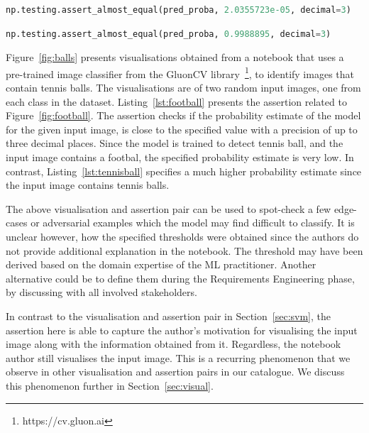 \documentclass[conference]{IEEEtran}
\begin{document}
\begin{lstlisting}[language=Python, caption={Assertion below Figure~\ref{fig:football}. It checks if the probability estimate of the model is close to the specified value. The input image is of a football. Since the model is trained to detect tennis balls, the specified value is very small.}, label={lst:football}]
np.testing.assert_almost_equal(pred_proba, 2.0355723e-05, decimal=3)
\end{lstlisting}

\begin{lstlisting}[language=Python, caption={Assertion below Figure~\ref{fig:tennisball}. Compared to Listing~\ref{lst:football}, the specified value is much higher, since the input image contains tennis balls.}, label={lst:tennisball}]
np.testing.assert_almost_equal(pred_proba, 0.9988895, decimal=3)
\end{lstlisting}

Figure~\ref{fig:balls} presents visualisations obtained from a notebook that uses a pre-trained image classifier from the GluonCV library~\footnote{https://cv.gluon.ai}, to identify images that contain tennis balls. The visualisations are of two random input images, one from each class in the dataset. Listing~\ref{lst:football} presents the assertion related to Figure~\ref{fig:football}. The assertion checks if the probability estimate of the model for the given input image, is close to the specified value with a precision of up to three decimal places. Since the model is trained to detect tennis ball, and the input image contains a footbal, the specified probability estimate is very low. In contrast, Listing~\ref{lst:tennisball} specifies a much higher probability estimate since the input image contains tennis balls.

The above visualisation and assertion pair can be used to spot-check a few edge-cases or adversarial examples which the model may find difficult to classify. It is unclear however, how the specified thresholds were obtained since the authors do not provide additional explanation in the notebook. The threshold may have been derived based on the domain expertise of the ML practitioner. Another alternative could be to define them during the Requirements Engineering phase, by discussing with all involved stakeholders\cite{CITEME}.

In contrast to the visualisation and assertion pair in Section~\ref{sec:svm}, the assertion here is able to capture the author's motivation for visualising the input image along with the information obtained from it. Regardless, the notebook author still visualises the input image. This is a recurring phenomenon that we observe in other visualisation and assertion pairs in our catalogue. We discuss this phenomenon further in Section~\ref{sec:visual}.
\end{document}
